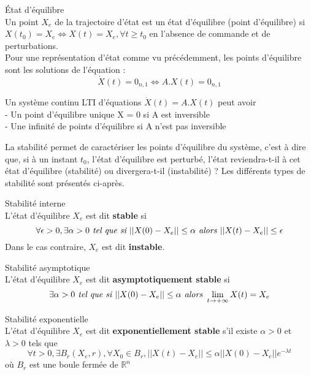 \begin{definition} État d'équilibre\\
	\label{defEtatEq}
Un point $X_e$ de la trajectoire d'état est un état d'équilibre (point d'équilibre) si $X(t_0) = X_e \Leftrightarrow X(t) = X_e, \forall t \geq t_0$ en l'absence de commande et de perturbations.\\
Pour une représentation d'état comme vu précédemment, les points d'équilibre sont les solutions de l'équation : 
\[\dot{X}(t) = 0_{n,1} \Leftrightarrow A.X(t) = 0_{n,1}\]
\end{definition}


\begin{theo}
	\label{theoAinversible}
Un système continu LTI d'équations $\dot{X}(t) = A.X(t)$ peut avoir\\
- Un point d'équilibre unique X = 0 si A est inversible\\
- Une infinité de points d'équilibre si A n'est pas inversible	
\end{theo}

La stabilité permet de caractériser les points d'équilibre du système, c'est à dire que, si à un instant $t_0$, l'état d'équilibre est perturbé, l'état reviendra-t-il à cet état d'équilibre (stabilité) ou divergera-t-il (instabilité) ? Les différents types de stabilité sont présentés ci-après.

\begin{definition} Stabilité interne\\
	\label{defInterne}
L'état d'équilibre $X_e$ est dit \textbf{stable} si
\[ \forall \epsilon > 0, \exists\alpha > 0 \emph{ tel que si } ||X(0) - X_e|| \leq \alpha \emph{ alors } ||X(t) - X_e|| \leq \epsilon \]	
Dans le cas contraire, $X_e$ est dit \textbf{instable}.
\end{definition}

\begin{definition} Stabilité asymptotique\\
	\label{defAsymp}
L'état d'équilibre $X_e$ est dit \textbf{asymptotiquement stable} si
\[ \exists\alpha > 0 \emph{ tel que si } ||X(0) - X_e|| \leq \alpha \emph{ alors } \lim\limits_{t \rightarrow +\infty} X(t) = X_e \]
\end{definition}

\begin{definition} Stabilité exponentielle\\
	\label{defExpo}
L'état d'équilibre $X_e$ est dit \textbf{exponentiellement stable} s'il existe $\alpha > 0$ et $\lambda > 0$ tels que 
\[ \forall t > 0, \exists B_r(X_e,r), \forall X_0 \in B_r, ||X(t) - X_e|| \leq \alpha||X(0) - X_e||e^{-\lambda t} \]
où $B_r$ est une boule fermée de $\mathbb{R}^n$
\end{definition}


